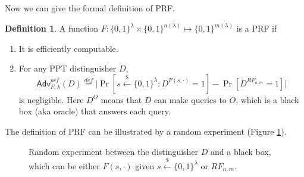 \documentclass[12pt]{article}
\newcommand{\eqdef}{\stackrel{def}{=}}
\newcommand{\bits}{\{0,1\}}
\newcommand{\getsr}{\stackrel{\$}{\gets}}
\newcommand{\Adv}{\mathsf{Adv}}
\theoremstyle{definition}
\newtheorem{definition}[theorem]{Definition}
\begin{document}
Now we can give the formal definition of PRF.
\begin{definition}
A function $F : \bits^\lambda \times \bits^{n(\lambda)} \mapsto \bits^{m(\lambda)}$ is a PRF if
\begin{enumerate}
\item It is efficiently computable.
\item For any PPT distinguisher $D$,
$$\Adv_{F,\lambda}^{prf}(D) \eqdef \bigg| \Pr[s \getsr \bits^\lambda: D^{F(s,\cdot)}=1] - \Pr[D^{RF_{n,m}}=1] \bigg|$$
is negligible. Here $D^{O}$ means that $D$ can make queries to $O$, which is a black box (aka oracle) that answers each query. 
\end{enumerate}
\end{definition}

The definition of PRF can be illustrated by a random experiment (Figure \ref{fig:re}).

\begin{figure}[!t]
\centering{}
\caption{Random experiment between the distinguisher $D$ and a black box, which can be either $F(s,\cdot)$ given $s\getsr\bits^\lambda$ or $RF_{n,m}$.}
\label{fig:re}
\end{figure}
\end{document}
